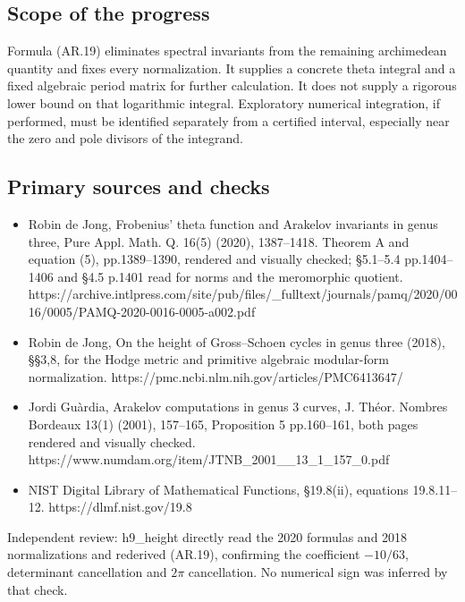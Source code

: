 \subsection{Scope of the progress}\label{scope-of-the-progress}

Formula (AR.19) eliminates spectral invariants from the remaining
archimedean quantity and fixes every normalization. It supplies a
concrete theta integral and a fixed algebraic period matrix for further
calculation. It does not supply a rigorous lower bound on that
logarithmic integral. Exploratory numerical integration, if performed,
must be identified separately from a certified interval, especially near
the zero and pole divisors of the integrand.

\subsection{Primary sources and
checks}\label{primary-sources-and-checks}

\begin{itemize}
\tightlist
\item
  Robin de Jong, Frobenius' theta function and Arakelov invariants in
  genus three, Pure Appl. Math. Q. 16(5) (2020), 1387--1418. Theorem A
  and equation (5), pp.1389--1390, rendered and visually checked;
  §5.1--5.4 pp.1404--1406 and §4.5 p.1401 read for norms and the
  meromorphic quotient.
  https://archive.intlpress.com/site/pub/files/\_fulltext/journals/pamq/2020/0016/0005/PAMQ-2020-0016-0005-a002.pdf
\item
  Robin de Jong, On the height of Gross--Schoen cycles in genus three
  (2018), §§3,8, for the Hodge metric and primitive algebraic
  modular-form normalization.
  https://pmc.ncbi.nlm.nih.gov/articles/PMC6413647/
\item
  Jordi Guàrdia, Arakelov computations in genus 3 curves, J. Théor.
  Nombres Bordeaux 13(1) (2001), 157--165, Proposition 5 pp.160--161,
  both pages rendered and visually checked.
  https://www.numdam.org/item/JTNB\_2001\_\_13\_1\_157\_0.pdf
\item
  NIST Digital Library of Mathematical Functions, §19.8(ii), equations
  19.8.11--12. https://dlmf.nist.gov/19.8
\end{itemize}

Independent review: h9\_height directly read the 2020 formulas and 2018
normalizations and rederived (AR.19), confirming the coefficient
\(-10/63\), determinant cancellation and \(2\pi\) cancellation. No
numerical sign was inferred by that check.
